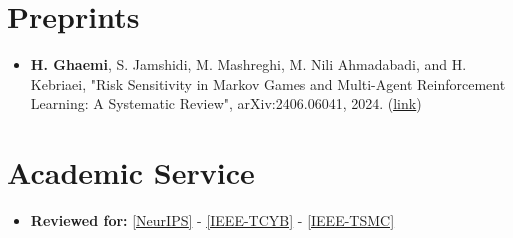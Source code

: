 \documentclass[A4,11pt]{article}
\makeatletter
\newcommand{\CVItem}[1]{
  \item\small{
    {#1 \vspace{-2pt}}
  }
}
\newcommand{\CVSubheading}[4]{
  \vspace{-2pt}\item
    \begin{tabular*}{0.97\textwidth}[t]{l@{\extracolsep{\fill}}r}
      \textbf{#1} & #2 \\
      \small#3 & \small #4 \\
    \end{tabular*}\vspace{-7pt}
}
\newcommand{\CVItemListStart}{\begin{itemize}}
\newcommand{\CVItemListEnd}{\end{itemize}\vspace{-5pt}}
\makeatother
\begin{document}



\section{Preprints}
\CVItemListStart
\CVItem{\textbf{H. Ghaemi}, S. Jamshidi, M. Mashreghi, M. Nili Ahmadabadi, and H. Kebriaei, "Risk Sensitivity in Markov Games and Multi-Agent Reinforcement Learning: A Systematic Review", arXiv:2406.06041, 2024. (\href{https://arxiv.org/abs/2406.06041}{\underline{link}})}
\CVItemListEnd


\section{Academic Service}
\CVItemListStart
\CVItem{\textbf{Reviewed for:} \href{https://neurips.cc/}{\underline{[NeurIPS}]} - \href{https://ieeexplore.ieee.org/xpl/RecentIssue.jsp?punumber=6221036}{\underline{[IEEE-TCYB]}} - \href{https://ieeexplore.ieee.org/xpl/RecentIssue.jsp?punumber=6221021}{\underline{[IEEE-TSMC]}}}
\CVItemListEnd
\end{document}
